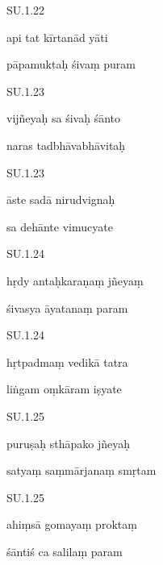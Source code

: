 \documentclass{article}
\begin{document}
	    
		SU.1.22 
    
	    
		api tat kīrtanād yāti 
    
	    
		pāpamuktaḥ śivaṃ puram 
    

    
	
	    
		SU.1.23 
    
	    
		vijñeyaḥ sa śivaḥ śānto 
    
	    
		naras tadbhāvabhāvitaḥ 
    

    
	
	    
		SU.1.23 
    
	    
		āste sadā nirudvignaḥ 
    
	    
		sa dehānte vimucyate 
    

    
	
	    
		SU.1.24 
    
	    
		hṛdy antaḥkaraṇaṃ jñeyaṃ 
    
	    
		śivasya āyatanaṃ param 
    

    
	
	    
		SU.1.24 
    
	    
		hṛtpadmaṃ vedikā tatra 
    
	    
		liṅgam oṃkāram iṣyate 
    

    
	
	    
		SU.1.25 
    
	    
		puruṣaḥ sthāpako jñeyaḥ 
    
	    
		satyaṃ saṃmārjanaṃ smṛtam 
    

    
	
	    
		SU.1.25 
    
	    
		ahiṃsā gomayaṃ proktaṃ 
    
	    
		śāntiś ca salilaṃ param 
    
\end{document}
